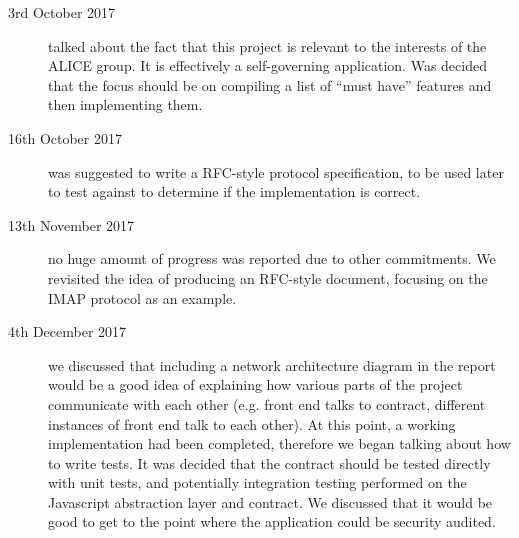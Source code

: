 \begin{description}
    \item[3rd October 2017] talked about the fact that this project is relevant to the interests of the ALICE group. It is effectively a self-governing application. Was decided that the focus should be on compiling a list of ``must have'' features and then implementing them.
    \item[16th October 2017] was suggested to write a RFC-style protocol specification, to be used later to test against to determine if the implementation is correct.
    \item[13th November 2017] no huge amount of progress was reported due to other commitments. We revisited the idea of producing an RFC-style document, focusing on the IMAP protocol as an example.
    \item[4th December 2017] we discussed that including a network architecture diagram in the report would be a good idea of explaining how various parts of the project communicate with each other (e.g. front end talks to contract, different instances of front end talk to each other). At this point, a working implementation had been completed, therefore we began talking about how to write tests. It was decided that the contract should be tested directly with unit tests, and potentially integration testing performed on the Javascript abstraction layer and contract. We discussed that it would be good to get to the point where the application could be security audited.
\end{description}

\pagebreak
{}

